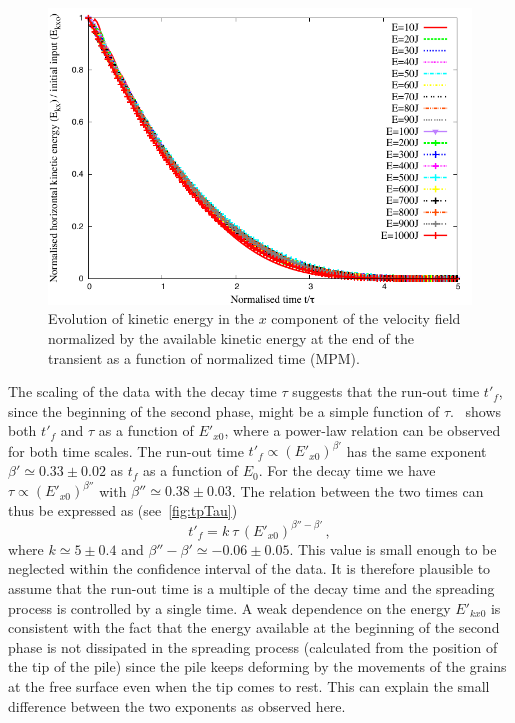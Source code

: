 \begin{figure}[tbhp]
\centering
\includegraphics[width=\textwidth]{EkxKoTTau_Slope}
\caption{Evolution of kinetic energy in the $x$ component of 
the velocity field  normalized by the available kinetic energy at the end of 
the transient as a function of normalized time (MPM).}
\label{fig:ExEx0_vs_ttau}
\end{figure}


The scaling of the data with the decay time $\tau$ suggests that the 
run-out time $t'_f$, since the beginning of the second phase, might be a simple 
function of $\tau$.~ shows both $t'_f$ and $\tau$ as 
a function of $E'_{x0}$, where a power-law relation can be observed for both 
time scales. The run-out time $t'_f \propto (E'_{x0})^{\beta'}$ has the 
same exponent $\beta' \simeq 0.33 \pm 0.02$ as $t_f$ as a function of $E_0$. 
For the decay time we have $\tau \propto (E'_{x0})^{\beta''}$ with $\beta'' 
\simeq 0.38 \pm 0.03$. The relation between the two times can thus be expressed 
as (see~\cref{fig:tpTau})
\begin{equation}
t'_f = k  \ \tau \, (E'_{x0})^{\beta'' - \beta'} \,,
\label{eqn:t'f}
\end{equation}
where $k \simeq 5 \pm 0.4$ and $\beta'' - \beta' \simeq -0.06 \pm 0.05$. This 
value is small enough to be neglected within the confidence interval of the 
data. It is therefore plausible to assume that the run-out time is a multiple 
of the decay time and the spreading process is controlled by a single time. A 
weak dependence on the energy $E'_{kx0}$ is consistent with the fact that the  
energy available at the beginning of the second phase is not dissipated in the 
spreading process (calculated from the position of the tip of the pile) since  
the pile keeps deforming by the movements of the grains at the free surface 
even when the tip comes to rest. This can explain the small difference between 
the two exponents as observed here.


